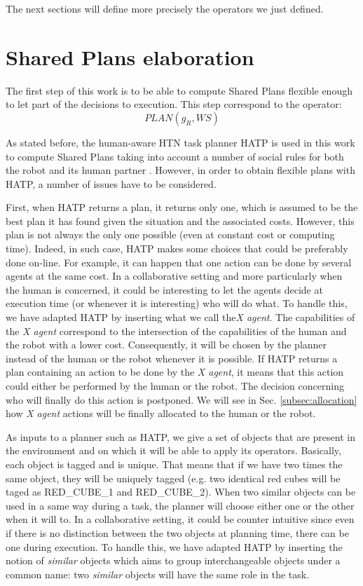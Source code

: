 \documentclass[english,a4paper,11pt,twoside]{StyleThese}
\begin{document}
The next sections will define more precisely the operators we just defined.


\section{Shared Plans elaboration}

The first step of this work is to be able to compute Shared Plans flexible enough to let part of the decisions to execution. This step correspond to the operator:
$$PLAN(g_R, WS)$$

As stated before, the human-aware HTN task planner HATP is used in this work to compute Shared Plans taking into account a number of social rules for both the robot and its human partner \cite{Lallement2014hatp}. However, in order to obtain flexible plans with HATP, a number of issues have to be considered.

First, when HATP returns a plan, it returns only one, which is assumed to be the best plan it has found given the situation and the associated costs. However, this plan is not always the only one possible (even at constant cost or computing time). Indeed, in such case, HATP makes some choices that could be preferably done on-line. For example, it can happen that one action can be done by several agents at the same cost. In a collaborative setting and more particularly when the human is concerned, it could be interesting to let the agents decide at execution time (or whenever it is interesting) who will do what. To handle this, we have adapted HATP by inserting what we call the\textit{X agent}. The capabilities of the \textit{X agent} correspond to the intersection of the capabilities of the human and the robot with a lower cost. Consequently, it will be chosen by the planner instead of the human or the robot whenever it is possible. If HATP returns a plan containing an action to be done by the \textit{X agent}, it means that this action could either be performed by the human or the robot. The decision concerning who will finally do this action is postponed. We will see in Sec. \ref{subsec:allocation} how \textit{X agent} actions will be finally allocated to the human or the robot.

As inputs to a planner such as HATP, we give a set of objects that are present in the environment and on which it will be able to apply its operators. Basically, each object is tagged and is unique. That means that if we have two times the same object, they will be uniquely tagged (e.g. two identical red cubes will be taged as RED\_CUBE\_1 and RED\_CUBE\_2). When two similar objects can be used in a same way during a task, the planner will choose either one or the other when it will to. In a collaborative setting, it could be counter intuitive since even if there is no distinction between the two objects at planning time, there can be one during execution. To handle this, we have adapted HATP by inserting the notion of \textit{similar} objects which aims to group interchangeable objects under a common name: two \textit{similar} objects will have the same role in the task. 
\end{document}
